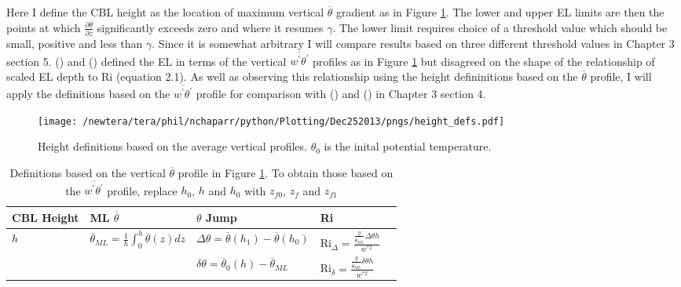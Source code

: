 Here I define the \acs{CBL} height as the location of maximum vertical $\overline{\theta}$ gradient as in Figure \ref{fig:hdefs}.  The lower and upper \acs{EL} limits are then the points at which $\frac{\partial \overline{\theta}}{\partial z}$ significantly exceeds zero and where it resumes $\gamma$.  The lower limit requires choice of a threshold value which should be small, positive and less than $\gamma$. Since it is somewhat arbitrary I will compare results based on three different threshold values in Chapter 3 section 5.  \citeauthor{FedConzMir04} (\citeyear{FedConzMir04}) and \citeauthor{BrooksFowler2} (\citeyear{BrooksFowler2}) defined the \acs{EL} in terms of the vertical $\overline{w^{'}\theta^{'}}$ profiles as in Figure \ref{fig:hdefs} but disagreed on the shape of the relationship of scaled \acs{EL} depth to \acs{Ri} (equation 2.1).  As well as observing this relationship using the height defininitions based on the $\overline{\theta}$ profile, I will apply the definitions based on the $\overline{w^{'}\theta^{'}}$ profile for comparison with \citeauthor{BrooksFowler2} (\citeyear{BrooksFowler2}) and \citeauthor{FedConzMir04} (\citeyear{FedConzMir04}) in Chapter 3 section 4.\\  

\begin{figure}[htbp]
    \centering
    \texttt{[image: /newtera/tera/phil/nchaparr/python/Plotting/Dec252013/pngs/height\_defs.pdf]}
    \caption[Height definitions]{Height definitions based on the average vertical profiles. $\theta_{0}$ is the inital potential temperature.}
    \label{fig:hdefs}   %
\end{figure}

\begin{table}[htbp]
    \begin{center}
    \begin{tabular}{ p{2cm} p{4cm}  p{3cm}  p{3cm} p{3cm} }
      \acs{CBL} Height & \acs{ML} $\overline{\theta}$ & $\theta$ Jump & \acs{Ri} \\ \hline 
       $h$ & $\overline{\theta}_{ML} = \frac{1}{h}\int^{h}_{0}\overline{\theta}(z)dz$ & $\Delta \theta=\overline{\theta}(h_{1})-\overline{\theta}(h_{0})$ & \acs{Ri}$_{\Delta}=\frac{\frac{g}{\overline{\theta}_{ML}}\Delta \theta h}{w^{*2}}$  \\ [.3cm] %
        
       & &$\delta \theta = \overline{\theta}_{0}(h)- \overline{\theta}_{ML}$ & \acs{Ri}$_{\delta}=\frac{\frac{g}{\overline{\theta}_{ML}} \delta \theta h}{w^{*2}}$ \\ \hline
      \end{tabular}
\caption[Height definitions]{Definitions based on the vertical $\overline{\theta}$ profile in Figure \ref{fig:hdefs}.  To obtain those based on the $\overline{w^{'}\theta^{'}}$ profile, replace $h_{0}$, $h$ and $h_{0}$ with $z_{f0}$, $z_{f}$ and $z_{f1}$}
\label{table:reldefs}   
\end{center}    
\end{table}

